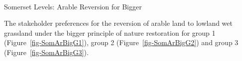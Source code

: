 \documentclass[
  12pt,
  letterpaper,
  DIV=11,
  numbers=noendperiod]{scrartcl}
\makeatletter
\let\oldparagraph\paragraph
\renewcommand{\paragraph}{
    \@ifstar
      \xxxParagraphStar
      \xxxParagraphNoStar
  }
\newcommand{\xxxParagraphStar}[1]{\oldparagraph*{#1}\mbox{}}
\newcommand{\xxxParagraphNoStar}[1]{\oldparagraph{#1}\mbox{}}
\makeatother
\begin{document}
\newpage{}

\paragraph{Somerset Levels: Arable Reversion for
Bigger}\label{somerset-levels-arable-reversion-for-bigger}

The stakeholder preferences for the reversion of arable land to lowland
wet grassland under the bigger principle of nature restoration for group
1 (Figure~\ref{fig-SomArBigG1}), group 2 (Figure~\ref{fig-SomArBigG2})
and group 3 (Figure~\ref{fig-SomArBigG3}).

\begin{figure}[H]

\end{figure}
\end{document}
